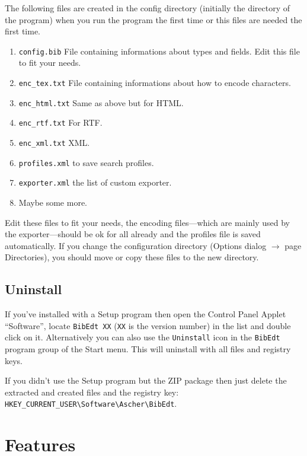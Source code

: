 \documentclass[oneside,10pt]{article}
\begin{document}
The following files are created in the config directory (initially the directory
of the program) when you run the program the first time or this files are needed
the first time.
\begin{enumerate}
  \item \verb|config.bib| File containing informations about types and fields. Edit this
     file to fit your needs.
  \item \verb|enc_tex.txt| File containing informations about how to encode characters.
  \item \verb|enc_html.txt| Same as above but for HTML.
  \item \verb|enc_rtf.txt| For RTF.
  \item \verb|enc_xml.txt| XML.
  \item \verb|profiles.xml| to save search profiles.
  \item \verb|exporter.xml| the list of custom exporter.
  \item Maybe some more.
\end{enumerate}
Edit these files to fit your needs, the encoding files---which are mainly used by
the exporter---should be ok for all already and the profiles file is saved automatically.
If you change the configuration directory (Options dialog $\rightarrow$ page Directories),
you should move or copy these files to the new directory.

\subsection{Uninstall}
\label{sec:Uninstall}

If you've installed \BibEdt{} with a Setup program then open the Control Panel Applet
``Software'', locate \verb|BibEdt XX| (\verb|XX| is the version number)
in the list and double click on it. Alternatively you  can also use the \verb|Uninstall|
icon in the \verb|BibEdt| program group of the Start menu. This will uninstall
\BibEdt{} with all files and registry keys.

If you didn't use the Setup program but the ZIP package then just delete the extracted
and created files and the registry key:\\
\verb|HKEY_CURRENT_USER\Software\Ascher\BibEdt|.

\section{Features}
\label{sec:Features}
\end{document}

